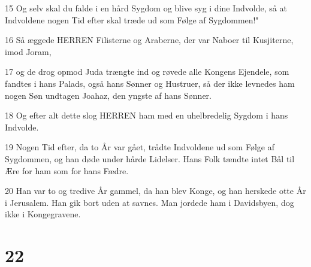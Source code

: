 \par 15 Og selv skal du falde i en hård Sygdom og blive syg i dine Indvolde, så at Indvoldene nogen Tid efter skal træde ud som Følge af Sygdommen!"
\par 16 Så æggede HERREN Filisterne og Araberne, der var Naboer til Kusjiterne, imod Joram,
\par 17 og de drog opmod Juda trængte ind og røvede alle Kongens Ejendele, som fandtes i hans Palads, også hans Sønner og Hustruer, så der ikke levnedes ham nogen Søn undtagen Joahaz, den yngste af hans Sønner.
\par 18 Og efter alt dette slog HERREN ham med en uhelbredelig Sygdom i hans Indvolde.
\par 19 Nogen Tid efter, da to År var gået, trådte Indvoldene ud som Følge af Sygdommen, og han døde under hårde Lidelser. Hans Folk tændte intet Bål til Ære for ham som for hans Fædre.
\par 20 Han var to og tredive År gammel, da han blev Konge, og han herskede otte År i Jerusalem. Han gik bort uden at savnes. Man jordede ham i Davidsbyen, dog ikke i Kongegravene.

\chapter{22}

